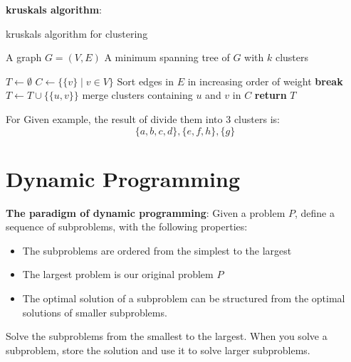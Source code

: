 \documentclass[onecolumn]{report}
\begin{document}
\textbf{kruskals algorithm}:
\begin{algorithm}[H]
\caption{kruskals algorithm for clustering}
\begin{algorithmic}[1]
    \Require A graph $G = (V,E)$
    \Ensure A minimum spanning tree of $G$ with $k$ clusters
    
      \State $T \gets \emptyset$
      \State $C \gets \{ \{v\} \mid v \in V \}$ 
      \State Sort edges in $E$ in increasing order of weight
          \State \textbf{break}
        \EndIf
          \State $T \gets T \cup \{\{u,v\}\}$
          \State merge clusters containing $u$ and $v$ in $C$
        \EndIf
      \EndFor
      \State \textbf{return} $T$
    \EndProcedure
\end{algorithmic}
\end{algorithm}
\noindent
For Given example, the result of divide them into 3 clusters is:\\
\begin{equation*}
    \{a,b,c,d\},\{e,f,h\},\{g\}
\end{equation*}
\noindent

\chapter{Dynamic Programming}
\textbf{The paradigm of dynamic programming}:
Given a problem $P$, define a sequence of subproblems, with the following properties:
\begin{itemize}
    \item The subproblems are ordered from the simplest to the largest
    \item The largest problem is our original problem $P$
    \item The optimal solution of a subproblem can be structured from the optimal solutions of smaller subproblems.
\end{itemize}
Solve the subproblems from the smallest to the largest. When you solve a subproblem, store the solution and use it to solve larger subproblems.\\
\end{document}
